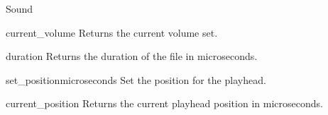 \begin{classdesc*}{Sound}
\begin{methoddesc}[Sound]{current_volume}{}
Returns the current volume set.
\end{methoddesc}

\begin{methoddesc}[Sound]{duration}{}
Returns the duration of the file in microseconds.
\end{methoddesc}

\begin{methoddesc}[Sound]{set_position}{microseconds}
Set the position for the playhead.
\end{methoddesc}

\begin{methoddesc}[Sound]{current_position}{}
Returns the current playhead position in microseconds.
\end{methoddesc}

\end{classdesc*}
